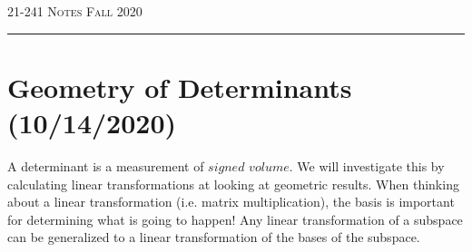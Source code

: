 \documentclass[12pt]{amsart}
\begin{document}
\thispagestyle{empty}

{\scshape 21-241} \hfill {\scshape \Large Notes} \hfill {\scshape Fall 2020}
\medskip
\hrule
\bigskip

\section*{Geometry of Determinants (10/14/2020)}
A determinant is a measurement of $signed$ $volume$. We will investigate this by calculating linear transformations at looking at geometric results. When thinking about a linear transformation (i.e. matrix multiplication), the basis is important for determining what is going to happen! Any linear transformation of a subspace can be generalized to a linear transformation of the bases of the subspace.\\
\end{document}
